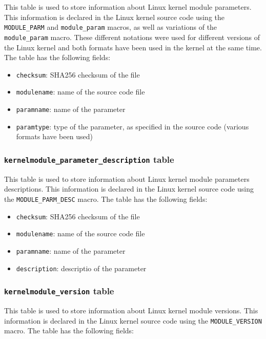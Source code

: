 \documentclass[10pt,a4paper]{article}
\begin{document}
This table is used to store information about Linux kernel module parameters.
This information is declared in the Linux kernel source code using the
\texttt{MODULE\_PARM} and \texttt{module\_param} macros, as well as variations
of the \texttt{module\_param} macro. These different notations were used for
different versions of the Linux kernel and both formats have been used in the
kernel at the same time. The table has the following fields:

\begin{itemize}
\item \texttt{checksum}: SHA256 checksum of the file
\item \texttt{modulename}: name of the source code file
\item \texttt{paramname}: name of the parameter
\item \texttt{paramtype}: type of the parameter, as specified in the source
code (various formats have been used)
\end{itemize}

\subsubsection{\texttt{kernelmodule\_parameter\_description} table}

This table is used to store information about Linux kernel module parameters
descriptions.  This information is declared in the Linux kernel source code
using the \texttt{MODULE\_PARM\_DESC} macro. The table has the following fields:

\begin{itemize}
\item \texttt{checksum}: SHA256 checksum of the file
\item \texttt{modulename}: name of the source code file
\item \texttt{paramname}: name of the parameter
\item \texttt{description}: descriptio of the parameter
\end{itemize}

\subsubsection{\texttt{kernelmodule\_version} table}

This table is used to store information about Linux kernel module versions.
This information is declared in the Linux kernel source code using the
\texttt{MODULE\_VERSION} macro. The table has the following fields:
\end{document}
